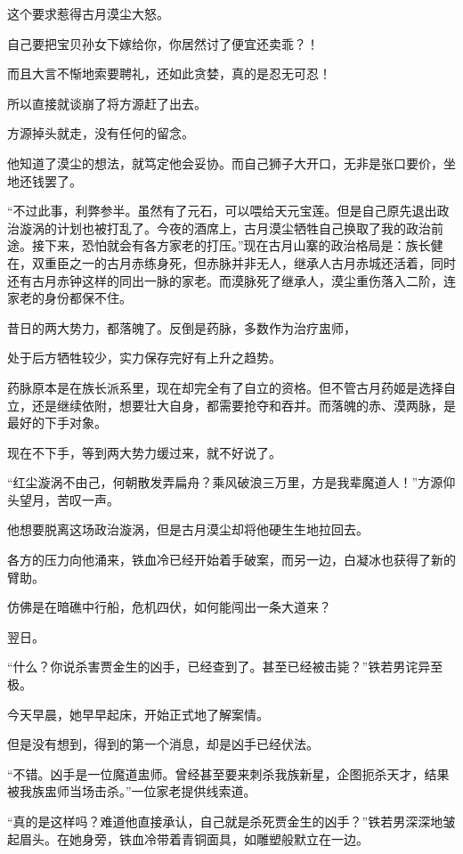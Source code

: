 \begin{this_body}
这个要求惹得古月漠尘大怒。

自己要把宝贝孙女下嫁给你，你居然讨了便宜还卖乖？！

而且大言不惭地索要聘礼，还如此贪婪，真的是忍无可忍！

所以直接就谈崩了将方源赶了出去。

方源掉头就走，没有任何的留念。

他知道了漠尘的想法，就笃定他会妥协。而自己狮子大开口，无非是张口要价，坐地还钱罢了。

“不过此事，利弊参半。虽然有了元石，可以喂给天元宝莲。但是自己原先退出政治漩涡的计划也被打乱了。今夜的酒席上，古月漠尘牺牲自己换取了我的政治前途。接下来，恐怕就会有各方家老的打压。”现在古月山寨的政治格局是：族长健在，双重臣之一的古月赤练身死，但赤脉并非无人，继承人古月赤城还活着，同时还有古月赤钟这样的同出一脉的家老。而漠脉死了继承人，漠尘重伤落入二阶，连家老的身份都保不住。

昔日的两大势力，都落魄了。反倒是药脉，多数作为治疗盅师，

处于后方牺牲较少，实力保存完好有上升之趋势。

药脉原本是在族长派系里，现在却完全有了自立的资格。但不管古月药姬是选择自立，还是继续依附，想要壮大自身，都需要抢夺和吞并。而落魄的赤、漠两脉，是最好的下手对象。

现在不下手，等到两大势力缓过来，就不好说了。

“红尘漩涡不由己，何朝散发弄扁舟？乘风破浪三万里，方是我辈魔道人！”方源仰头望月，苦叹一声。

他想要脱离这场政治漩涡，但是古月漠尘却将他硬生生地拉回去。

各方的压力向他涌来，铁血冷已经开始着手破案，而另一边，白凝冰也获得了新的臂助。

仿佛是在暗礁中行船，危机四伏，如何能闯出一条大道来？

翌日。

“什么？你说杀害贾金生的凶手，已经查到了。甚至已经被击毙？”铁若男诧异至极。

今天早晨，她早早起床，开始正式地了解案情。

但是没有想到，得到的第一个消息，却是凶手已经伏法。

“不错。凶手是一位魔道盅师。曾经甚至要来刺杀我族新星，企图扼杀天才，结果被我族盅师当场击杀。”一位家老提供线索道。

“真的是这样吗？难道他直接承认，自己就是杀死贾金生的凶手？”铁若男深深地皱起眉头。在她身旁，铁血冷带着青铜面具，如雕塑般默立在一边。


\end{this_body}
